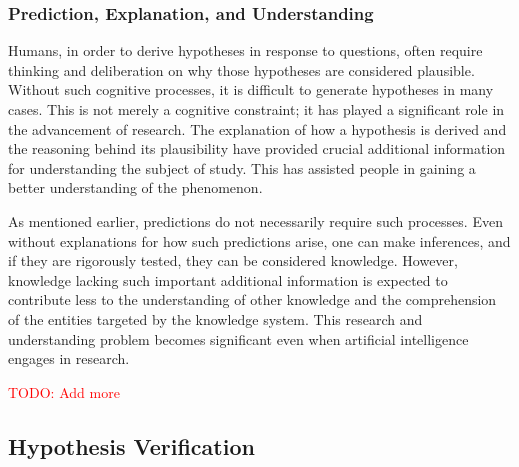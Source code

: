 \documentclass{book}
\begin{document}
\subsubsection{Prediction, Explanation, and Understanding}
Humans, in order to derive hypotheses in response to questions, often require thinking and deliberation on why those hypotheses are considered plausible. Without such cognitive processes, it is difficult to generate hypotheses in many cases. This is not merely a cognitive constraint; it has played a significant role in the advancement of research. The explanation of how a hypothesis is derived and the reasoning behind its plausibility have provided crucial additional information for understanding the subject of study. This has assisted people in gaining a better understanding of the phenomenon.

As mentioned earlier, predictions do not necessarily require such processes. Even without explanations for how such predictions arise, one can make inferences, and if they are rigorously tested, they can be considered knowledge. However, knowledge lacking such important additional information is expected to contribute less to the understanding of other knowledge and the comprehension of the entities targeted by the knowledge system. This research and understanding problem becomes significant even when artificial intelligence engages in research.

\textcolor{red}{TODO: Add more}






\subsection{Hypothesis Verification}
\end{document}
